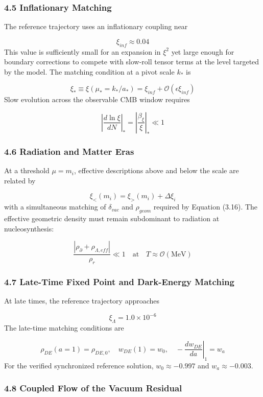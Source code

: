 \documentclass[aps,prd,onecolumn,superscriptaddress,nofootinbib,longbibliography,10pt]{revtex4-2}
\begin{document}
  
\subsubsection*{4.5 Inflationary Matching}

  The reference trajectory uses an inflationary coupling near


  \[ \xi_{inf} \approx 0.04 \]
  This value is sufficiently small for an expansion in \(\xi^2\) yet large enough for boundary corrections to compete with slow-roll tensor terms at the level targeted by the model. The matching condition at a pivot scale \(k_*\) is


  \[ \xi_* \equiv \xi(\mu_* = k_*/a_*) = \xi_{inf} + \mathcal{O}(\epsilon \xi_{inf}) \]
  Slow evolution across the observable CMB window requires


  \[ \left| \frac{d\ln\xi}{dN} \right|_* = \left| \frac{\beta_\xi}{\xi} \right|_* \ll 1 \]

  
\subsubsection*{4.6 Radiation and Matter Eras}

  At a threshold \(\mu = m_i\), effective descriptions above and below the scale are related by


  \[ \xi_<(m_i) = \xi_>(m_i) + \Delta\xi_i \]
  with a simultaneous matching of \(\delta_{vac}\) and \(\rho_{geom}\) required by Equation (3.16). The effective geometric density must remain subdominant to radiation at nucleosynthesis:


  \[ \frac{|\rho_\partial + \rho_{\Lambda,eff}|}{\rho_r} \ll 1 \quad \text{at} \quad T \approx \mathcal{O}(\text{MeV}) \]

  
\subsubsection*{4.7 Late-Time Fixed Point and Dark-Energy Matching}

  At late times, the reference trajectory approaches


  \[ \xi_\Lambda = 1.0 \times 10^{-6} \]
  The late-time matching conditions are


  \[ \rho_{DE}(a=1) = \rho_{DE,0}, \quad w_{DE}(1) = w_0, \quad -\left.\frac{dw_{DE}}{da}\right|_1 = w_a \]
  For the verified synchronized reference solution, \(w_0 \approx -0.997\) and \(w_a \approx -0.003\).



  
\subsubsection*{4.8 Coupled Flow of the Vacuum Residual}
\end{document}
